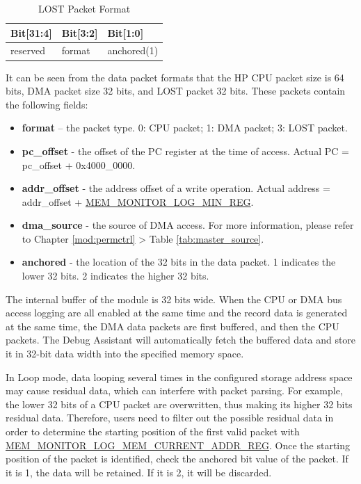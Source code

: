 \documentclass[main\_\_EN.tex]{subfiles}
\begin{document}
    \begin{longtable}[c]{|L{3cm}|L{3cm}|l|}
    \caption{LOST Packet Format}\label{tab:lost_package}
    \\\hline
    {\bfseries Bit[31:4]} & {\bfseries Bit[3:2]} & {\bfseries Bit[1:0]} \\\hline
    reserved & format & anchored(1) \\\hline
    \end{longtable}

It can be seen from the data packet formats that the HP CPU packet size is 64 bits, DMA packet size 32 bits, and LOST packet 32 bits. These packets contain the following fields:

\begin{itemize}
    \item {\bfseries format} – the packet type. 0: CPU packet; 1: DMA packet; 3: LOST packet.
    \item {\bfseries pc\_offset} - the offset of the PC register at the time of access. Actual PC = pc\_offset + 0x4000\_0000.
    \item {\bfseries addr\_offset} - the address offset of a write operation. Actual address = addr\_offset + \hyperref[regdesc:MEMMONITORLOGMINREG]{MEM\_MONITOR\_LOG\_MIN\_REG}.
    \item {\bfseries dma\_source} - the source of DMA access. For more information, please refer to Chapter \ref{mod:permctrl} \textit{} > Table \ref{tab:master_source}.
    \item {\bfseries anchored} - the location of the 32 bits in the data packet. 1 indicates the lower 32 bits. 2 indicates the higher 32 bits.

\end{itemize}


The internal buffer of the module is 32 bits wide. When the CPU or DMA bus access logging are all enabled at the same time and the record data is generated at the same time, the DMA data packets are first buffered, and then the CPU packets. The Debug Assistant will automatically fetch the buffered data and store it in 32-bit data width into the specified memory space.


In Loop mode, data looping several times in the configured storage address space may cause residual data, which can interfere with packet parsing. For example, the lower 32 bits of a CPU packet are overwritten, thus making its higher 32 bits residual data. Therefore, users need to filter out the possible residual data in order to determine the starting position of the first valid packet with \hyperref[regdesc:MEMMONITORLOGMEMCURRENTADDRREG]{MEM\_MONITOR\_LOG\_MEM\_CURRENT\_ADDR\_REG}. Once the starting position of the packet is identified, check the anchored bit value of the packet. If it is 1, the data will be retained. If it is 2, it will be discarded.
\end{document}
